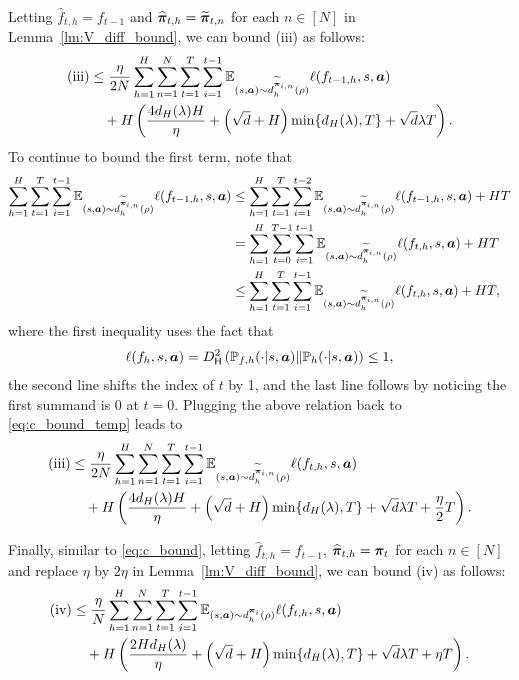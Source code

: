 Letting $\widehat{f}_{t,h}=f_{t-1}$ and
$\widehat{{\bm{\pi}}}_{t,h}=\widetilde{{\bm{\pi}}}_{t,n}$ for each $n \in [N]$ in Lemma~\ref{lm:V_diff_bound}, we can bound (iii) as follows:
\begin{align}\label{eq:c_bound_temp} 
    \text{(iii)}&\leq \frac{\eta}{2N}\sum_{h=1}^H\sum_{n=1}^N\sum_{t=1}^T \sum_{i=1}^{t-1} \mathbb{E}_{(s,{\bm{a}})\sim d_h^{\widetilde{{\bm{\pi}}}_{i,n}}(\rho)}\ell(f_{t-1,h},s,{\bm{a}}) \notag\\
    &\quad+H\left(\frac{4d_H(\lambda)H}{\eta}
    + \left(\sqrt{d}+H\right) \min\{d_H(\lambda),T\} +\sqrt{d} \lambda T\right).
\end{align}
To continue to bound the first term, note that
\begin{align}
\sum_{h=1}^H \sum_{t=1}^T \sum_{i=1}^{t-1} \mathbb{E}_{(s,{\bm{a}})\sim d_h^{\widetilde{{\bm{\pi}}}_{i,n}}(\rho)}\ell(f_{t-1,h},s,{\bm{a}})   & \leq  \sum_{h=1}^H \sum_{t=1}^T \sum_{i=1}^{t-2} \mathbb{E}_{(s,{\bm{a}})\sim d_h^{\widetilde{{\bm{\pi}}}_{i,n}}(\rho)}\ell(f_{t-1,h},s,{\bm{a}}) + HT  \nonumber \\
    &= \sum_{h=1}^H \sum_{t=0}^{T-1} \sum_{i=1}^{t-1} \mathbb{E}_{(s,{\bm{a}})\sim d_h^{\widetilde{{\bm{\pi}}}_{i,n}} 
    (\rho)}\ell(f_{t,h},s,{\bm{a}}) +HT \notag\\
    &\leq  \sum_{h=1}^H \sum_{t=1}^{T} \sum_{i=1}^{t-1} \mathbb{E}_{(s,{\bm{a}})\sim d_h^{\widetilde{{\bm{\pi}}}_{i,n}}(\rho)}\ell(f_{t,h},s,{\bm{a}}) + HT, \nonumber
\end{align}
where the first inequality uses the fact that
\begin{align}
    \ell(f_h,s,{\bm{a}})=D_{\mathsf{H}}^2\left({\mathbb P}_{f,h}(\cdot|s,{\bm{a}})\|{\mathbb P}_h(\cdot|s,{\bm{a}})\right)\leq 1,
\end{align}
the second line shifts the index of $t$ by 1, and the last line follows by noticing the first summand is $0$ at $t=0$. Plugging the above relation back to \eqref{eq:c_bound_temp} leads to
\begin{align}\label{eq:c_bound} 
    \text{(iii)}&\leq \frac{\eta}{2N}\sum_{h=1}^H \sum_{n=1}^N \sum_{t=1}^{T} \sum_{i=1}^{t-1} \mathbb{E}_{(s,{\bm{a}})\sim d_h^{\widetilde{{\bm{\pi}}}_{i,n}}(\rho)}\ell(f_{t,h},s,{\bm{a}})  \notag\\
    &\quad+H\left(\frac{4d_H(\lambda)H}{\eta}
    + \left(\sqrt{d}+H\right) \min\{d_H(\lambda),T\} +\sqrt{d} \lambda T + \frac{\eta}{2} T \right).
\end{align}

Finally, similar to \eqref{eq:c_bound}, letting $\widehat{f}_{t,h}=f_{t-1}$, $\widehat{{\bm{\pi}}}_{t,h}={\bm{\pi}}_t$ for each $n \in [N]$ and replace $\eta$ by $2\eta$ in Lemma~\ref{lm:V_diff_bound}, we can bound (iv) as follows:
\begin{align}\label{eq:d_bound} 
    \text{(iv)} &\leq \frac{\eta}{N}\sum_{h=1}^H\sum_{n=1}^N\sum_{t=1}^{T} \sum_{i=1}^{t-1} \mathbb{E}_{(s,{\bm{a}})\sim d_h^{{\bm{\pi}}_i}(\rho)}\ell(f_{t,h},s,{\bm{a}}) \notag\\
    &\quad+H\left(\frac{2Hd_H(\lambda)}{\eta}
    + \left(\sqrt{d}+H\right) \min\{d_H(\lambda),T\} +\sqrt{d} \lambda T +\eta T\right).
\end{align}

